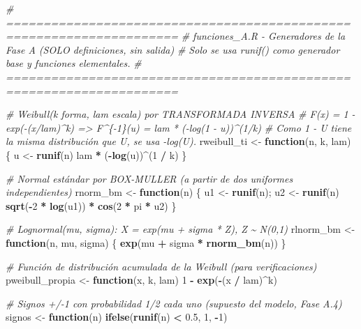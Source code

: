 \documentclass[
  spanish,
]{article}
\newenvironment{Shaded}{\begin{snugshade}}{\end{snugshade}}
\newcommand{\CommentTok}[1]{\textcolor[rgb]{0.56,0.35,0.01}{\textit{#1}}}
\newcommand{\ControlFlowTok}[1]{\textcolor[rgb]{0.13,0.29,0.53}{\textbf{#1}}}
\newcommand{\DecValTok}[1]{\textcolor[rgb]{0.00,0.00,0.81}{#1}}
\newcommand{\FloatTok}[1]{\textcolor[rgb]{0.00,0.00,0.81}{#1}}
\newcommand{\FunctionTok}[1]{\textcolor[rgb]{0.13,0.29,0.53}{\textbf{#1}}}
\newcommand{\NormalTok}[1]{#1}
\newcommand{\OtherTok}[1]{\textcolor[rgb]{0.56,0.35,0.01}{#1}}
\newcommand{\SpecialCharTok}[1]{\textcolor[rgb]{0.81,0.36,0.00}{\textbf{#1}}}
\begin{document}
\begin{Shaded}
\begin{Highlighting}[]
\CommentTok{\# =====================================================================}
\CommentTok{\# funciones\_A.R {-} Generadores de la Fase A (SOLO definiciones, sin salida)}
\CommentTok{\# Solo se usa runif() como generador base y funciones elementales.}
\CommentTok{\# =====================================================================}

\CommentTok{\# Weibull(k forma, lam escala) por TRANSFORMADA INVERSA}
\CommentTok{\# F(x) = 1 {-} exp({-}(x/lam)\^{}k)  =\textgreater{}  F\^{}\{{-}1\}(u) = lam * ({-}log(1 {-} u))\^{}(1/k)}
\CommentTok{\# Como 1 {-} U tiene la misma distribución que U, se usa {-}log(U).}
\NormalTok{rweibull\_ti }\OtherTok{\textless{}{-}} \ControlFlowTok{function}\NormalTok{(n, k, lam) \{}
\NormalTok{  u }\OtherTok{\textless{}{-}} \FunctionTok{runif}\NormalTok{(n)}
\NormalTok{  lam }\SpecialCharTok{*}\NormalTok{ (}\SpecialCharTok{{-}}\FunctionTok{log}\NormalTok{(u))}\SpecialCharTok{\^{}}\NormalTok{(}\DecValTok{1} \SpecialCharTok{/}\NormalTok{ k)}
\NormalTok{\}}

\CommentTok{\# Normal estándar por BOX{-}MULLER (a partir de dos uniformes independientes)}
\NormalTok{rnorm\_bm }\OtherTok{\textless{}{-}} \ControlFlowTok{function}\NormalTok{(n) \{}
\NormalTok{  u1 }\OtherTok{\textless{}{-}} \FunctionTok{runif}\NormalTok{(n); u2 }\OtherTok{\textless{}{-}} \FunctionTok{runif}\NormalTok{(n)}
  \FunctionTok{sqrt}\NormalTok{(}\SpecialCharTok{{-}}\DecValTok{2} \SpecialCharTok{*} \FunctionTok{log}\NormalTok{(u1)) }\SpecialCharTok{*} \FunctionTok{cos}\NormalTok{(}\DecValTok{2} \SpecialCharTok{*}\NormalTok{ pi }\SpecialCharTok{*}\NormalTok{ u2)}
\NormalTok{\}}

\CommentTok{\# Lognormal(mu, sigma): X = exp(mu + sigma * Z), Z \textasciitilde{} N(0,1)}
\NormalTok{rlnorm\_bm }\OtherTok{\textless{}{-}} \ControlFlowTok{function}\NormalTok{(n, mu, sigma) \{}
  \FunctionTok{exp}\NormalTok{(mu }\SpecialCharTok{+}\NormalTok{ sigma }\SpecialCharTok{*} \FunctionTok{rnorm\_bm}\NormalTok{(n))}
\NormalTok{\}}

\CommentTok{\# Función de distribución acumulada de la Weibull (para verificaciones)}
\NormalTok{pweibull\_propia }\OtherTok{\textless{}{-}} \ControlFlowTok{function}\NormalTok{(x, k, lam) }\DecValTok{1} \SpecialCharTok{{-}} \FunctionTok{exp}\NormalTok{(}\SpecialCharTok{{-}}\NormalTok{(x }\SpecialCharTok{/}\NormalTok{ lam)}\SpecialCharTok{\^{}}\NormalTok{k)}

\CommentTok{\# Signos +/{-}1 con probabilidad 1/2 cada uno (supuesto del modelo, Fase A.4)}
\NormalTok{signos }\OtherTok{\textless{}{-}} \ControlFlowTok{function}\NormalTok{(n) }\FunctionTok{ifelse}\NormalTok{(}\FunctionTok{runif}\NormalTok{(n) }\SpecialCharTok{\textless{}} \FloatTok{0.5}\NormalTok{, }\DecValTok{1}\NormalTok{, }\SpecialCharTok{{-}}\DecValTok{1}\NormalTok{)}
\end{Highlighting}
\end{Shaded}
\end{document}
